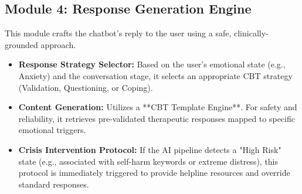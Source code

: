 \subsection{Module 4: Response Generation Engine}
This module crafts the chatbot's reply to the user using a safe, clinically-grounded approach.
\begin{itemize}
    \item \textbf{Response Strategy Selector:} Based on the user's emotional state (e.g., Anxiety) and the conversation stage, it selects an appropriate CBT strategy (Validation, Questioning, or Coping).
    \item \textbf{Content Generation:} Utilizes a **CBT Template Engine**. For safety and reliability, it retrieves pre-validated therapeutic responses mapped to specific emotional triggers.
    \item \textbf{Crisis Intervention Protocol:} If the AI pipeline detects a "High Risk" state (e.g., associated with self-harm keywords or extreme distress), this protocol is immediately triggered to provide helpline resources and override standard responses.
\end{itemize}
